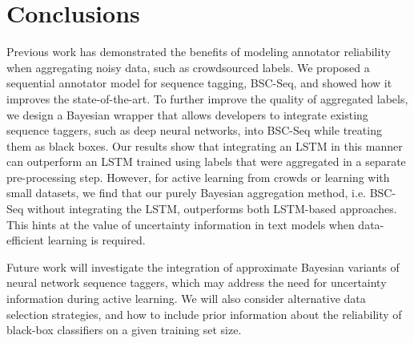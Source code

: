 \section{Conclusions}

Previous work has demonstrated the benefits of modeling annotator reliability when aggregating noisy data, 
such as crowdsourced labels. 
We proposed a sequential annotator model for sequence tagging, BSC-Seq,
and showed how it improves the state-of-the-art. 
To further improve the quality of aggregated labels,
we design a Bayesian wrapper that allows developers to integrate existing sequence taggers, 
such as deep neural networks, into BSC-Seq while
treating them as black boxes.
Our results show that integrating an LSTM in this manner can outperform an LSTM trained 
using labels that were aggregated in a separate pre-processing step. 
However, for active learning from crowds or learning with small datasets, 
we find that our purely Bayesian aggregation method, i.e. BSC-Seq without integrating the LSTM,
outperforms both LSTM-based approaches. This hints at the value of uncertainty information
in text models when data-efficient learning is required. 

Future work will investigate the integration of approximate Bayesian variants of neural network
sequence taggers, which may address the need for uncertainty information during active learning.
We will also consider
alternative data selection strategies, and how to include %
prior information about the reliability of black-box classifiers on a given training set size.


